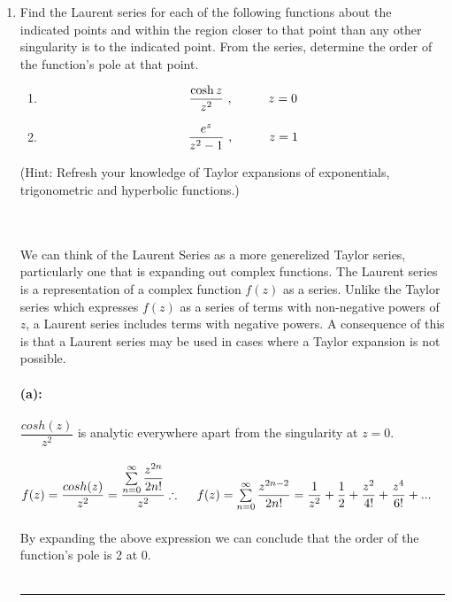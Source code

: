 \documentclass[fleqn]{article}
\begin{document}
\begin{enumerate}
    \item Find the Laurent series for each of the following functions about the indicated points and within the region closer to that point than any other singularity is to the indicated point. From the series, determine the order of the function's pole at that point.
    \begin{enumerate}
      \item $$\frac{\cosh z}{z^2}~, \hskip 1truecm z=0$$
      \item $$\frac{e^z}{z^2-1}~, \hskip 1truecm z=1$$  
    \end{enumerate}
    (Hint: Refresh your knowledge of Taylor expansions of exponentials, trigonometric and hyperbolic functions.)
    
    \textcolor{hwColor}{
      \\
      \\
      We can think of the Laurent Series as a more generelized Taylor series, particularly one that is expanding 
      out complex functions. The Laurent series is a representation of a complex function $f(z)$ as a series.
      Unlike the Taylor series which expresses $f(z)$ as a series of terms with non-negative powers of $z$, a Laurent 
      series includes terms with negative powers. A consequence of this is that a Laurent series may be used in cases where a Taylor expansion is not
      possible.
      \\
      \\
      \textbf{(a):}
      \\
      \\
      $\dfrac{cosh(z)}{z^2}$ is analytic everywhere apart from the singularity at $z=0$.
      \\
      \\
      $
        f(z)=\dfrac{cosh(z)}{z^2}=\dfrac{\sum\limits_{n=0}^{\infty} \dfrac{z^{2n}}{2n!}}{z^2}
        \\
        \\
        \\
        \therefore ~~~~ f(z)=\sum\limits_{n=0}^{\infty} \dfrac{z^{2n-2}}{2n!}=\dfrac{1}{z^2}+\dfrac{1}{2}+\dfrac{z^2}{4!}+\dfrac{z^4}{6!}+...
      $
      \\
      \\
      By expanding the above expression we can conclude that the order of the function's pole is 2 at 0. 
      \\
      \\
      \rule{15cm}{1pt}
      \\
      \\
}
\end{enumerate}
\end{document}
